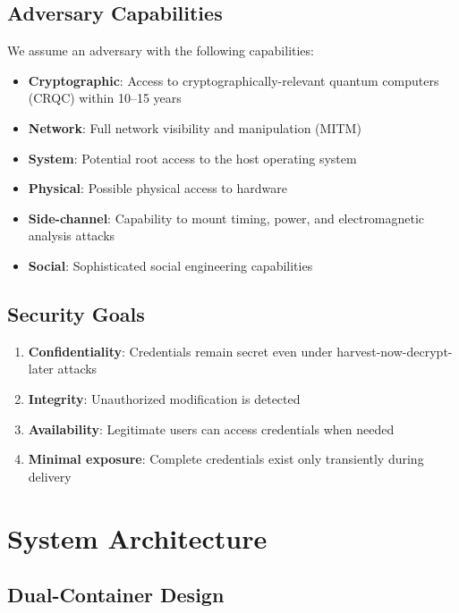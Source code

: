 \documentclass[11pt,a4paper]{article}
\begin{document}
\subsection{Adversary Capabilities}

We assume an adversary with the following capabilities:

\begin{itemize}
    \item \textbf{Cryptographic}: Access to cryptographically-relevant quantum computers (CRQC) within 10--15 years
    \item \textbf{Network}: Full network visibility and manipulation (MITM)
    \item \textbf{System}: Potential root access to the host operating system
    \item \textbf{Physical}: Possible physical access to hardware
    \item \textbf{Side-channel}: Capability to mount timing, power, and electromagnetic analysis attacks
    \item \textbf{Social}: Sophisticated social engineering capabilities
\end{itemize}

\subsection{Security Goals}

\begin{enumerate}
    \item \textbf{Confidentiality}: Credentials remain secret even under harvest-now-decrypt-later attacks
    \item \textbf{Integrity}: Unauthorized modification is detected
    \item \textbf{Availability}: Legitimate users can access credentials when needed
    \item \textbf{Minimal exposure}: Complete credentials exist only transiently during delivery
\end{enumerate}

\section{System Architecture}

\subsection{Dual-Container Design}
\end{document}

